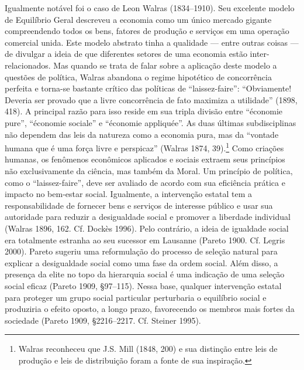\documentclass[12pt]{article}
\begin{document}
Igualmente notável foi o caso de Leon Walras (1834–1910). Seu excelente modelo de Equilíbrio Geral descreveu a economia como um único mercado gigante compreendendo todos os bens, fatores de produção e serviços em uma operação comercial unida. Este modelo abstrato tinha a qualidade — entre outras coisas — de divulgar a ideia de que diferentes setores de uma economia estão inter-relacionados. Mas quando se trata de falar sobre a aplicação deste modelo a questões de política, Walras abandona o regime hipotético de concorrência perfeita e torna-se bastante crítico das políticas de “laissez-faire”: “Obviamente! Deveria ser provado que a livre concorrência de fato maximiza a utilidade” (1898, 418). A principal razão para isso reside em sua tripla divisão entre “économie pure”, “économie sociale” e “économie appliquée”. As duas últimas subdisciplinas não dependem das leis da natureza como a economia pura, mas da “vontade humana que é uma força livre e perspicaz” (Walras 1874, 39).\footnote{Walras reconheceu que J.S. Mill (1848, 200) e sua distinção entre leis de produção e leis de distribuição foram a fonte de sua inspiração.} Como criações humanas, os fenômenos econômicos aplicados e sociais extraem seus princípios não exclusivamente da ciência, mas também da Moral. Um princípio de política, como o “laissez-faire”, deve ser avaliado de acordo com sua eficiência prática e impacto no bem-estar social. Igualmente, a intervenção estatal tem a responsabilidade de fornecer bens e serviços de interesse público e usar sua autoridade para reduzir a desigualdade social e promover a liberdade individual (Walras 1896, 162. Cf. Dockès 1996). Pelo contrário, a ideia de igualdade social era totalmente estranha ao seu sucessor em Lausanne (Pareto 1900. Cf. Legris 2000). Pareto sugeriu uma reformulação do processo de seleção natural para explicar a desigualdade social como uma fase da ordem social. Além disso, a presença da elite no topo da hierarquia social é uma indicação de uma seleção social eficaz (Pareto 1909, §97–115). Nessa base, qualquer intervenção estatal para proteger um grupo social particular perturbaria o equilíbrio social e produziria o efeito oposto, a longo prazo, favorecendo os membros mais fortes da sociedade (Pareto 1909, §2216–2217. Cf. Steiner 1995).
\end{document}

